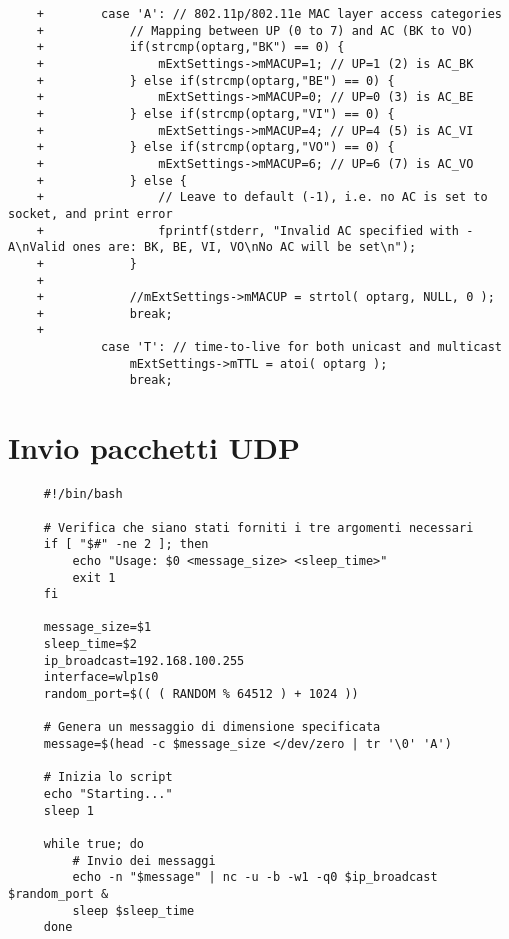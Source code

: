 \begin{lstlisting}
    +        case 'A': // 802.11p/802.11e MAC layer access categories
    +            // Mapping between UP (0 to 7) and AC (BK to VO)
    +            if(strcmp(optarg,"BK") == 0) {
    +                mExtSettings->mMACUP=1; // UP=1 (2) is AC_BK
    +            } else if(strcmp(optarg,"BE") == 0) {
    +                mExtSettings->mMACUP=0; // UP=0 (3) is AC_BE
    +            } else if(strcmp(optarg,"VI") == 0) {
    +                mExtSettings->mMACUP=4; // UP=4 (5) is AC_VI
    +            } else if(strcmp(optarg,"VO") == 0) {
    +                mExtSettings->mMACUP=6; // UP=6 (7) is AC_VO
    +            } else {
    +                // Leave to default (-1), i.e. no AC is set to socket, and print error
    +                fprintf(stderr, "Invalid AC specified with -A\nValid ones are: BK, BE, VI, VO\nNo AC will be set\n");
    +            }
    +
    +            //mExtSettings->mMACUP = strtol( optarg, NULL, 0 );
    +            break;
    +
             case 'T': // time-to-live for both unicast and multicast
                 mExtSettings->mTTL = atoi( optarg );
                 break;
\end{lstlisting}

\section{Invio pacchetti UDP}
\label{udp_packets}
\begin{lstlisting}
     #!/bin/bash

     # Verifica che siano stati forniti i tre argomenti necessari
     if [ "$#" -ne 2 ]; then
         echo "Usage: $0 <message_size> <sleep_time>"
         exit 1
     fi
     
     message_size=$1
     sleep_time=$2
     ip_broadcast=192.168.100.255
     interface=wlp1s0
     random_port=$(( ( RANDOM % 64512 ) + 1024 ))
     
     # Genera un messaggio di dimensione specificata
     message=$(head -c $message_size </dev/zero | tr '\0' 'A')
     
     # Inizia lo script
     echo "Starting..."
     sleep 1
     
     while true; do
         # Invio dei messaggi
         echo -n "$message" | nc -u -b -w1 -q0 $ip_broadcast $random_port &
         sleep $sleep_time
     done
\end{lstlisting}


